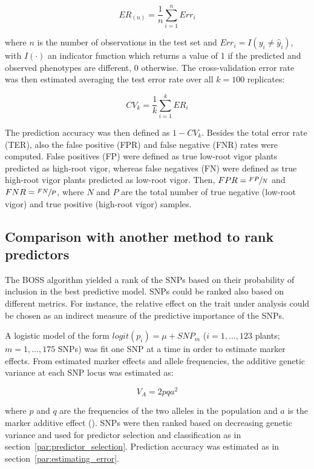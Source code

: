 \begin{equation} \label{eq:testerr}
 ER_{(n)}=\frac{1}{n} \sum_{i=1}^{n} Err_i
\end{equation}

where $n$ is the number of observations in the test set and $Err_i=I(y_i \neq \hat{y}_i)$, with $I(\cdot)$ an indicator function
which returns a value of 1 if the predicted and observed phenotypes are
different, 0 otherwise. 
The cross-validation error rate was then estimated averaging the test error
rate over all $k=100$ replicates:

\begin{equation} \label{eq:cverr}
CV_{k}=\frac{1}{k} \sum_{i=1}^k ER_i
\end{equation}

The prediction accuracy was then defined as $1-CV_k$. Besides the total
error rate (TER), also the false positive (FPR) and false negative (FNR) rates
were computed. False positives (FP) were defined as true low-root vigor
plants predicted as high-root vigor, whereas false negatives (FN) were
defined as true high-root vigor plants predicted as low-root vigor.
Then, $FPR=\sfrac{FP}{N}$ and $FNR=\sfrac{FN}{P}$, where $N$ and $P$ are
the total number of true negative (low-root vigor) and true positive
(high-root vigor) samples.

\subsection{Comparison with another method to rank predictors}
\label{sec:other_ranker}
The BOSS algorithm yielded a rank of the SNPs based on their probability
of inclusion in the best predictive model. SNPs could be ranked also
based on different metrics. For instance, the relative effect on the
trait under analysis could be chosen as an indirect measure of the
predictive importance of the SNPs.

A logistic model of the form $logit(p_i)=\mu+SNP_m$ ($i=1,\ldots,123$
plants; $m=1,\ldots, 175$ SNPs) was fit one SNP
at a time in order to estimate marker effects.
From estimated marker effects and allele frequencies, the additive
genetic variance at each SNP locus was estimated as:

\begin{equation}
V_A=2pqa^2
\end{equation}

where $p$ and $q$ are the frequencies of the two alleles in the
population and $a$ is the marker additive effect
(\cite{gianola2009additive}).
SNPs were then ranked based on decreasing genetic variance and used for
predictor selection and classification as in
section~\ref{par:predictor_selection}. Prediction accuracy was estimated
as in section~\ref{par:estimating_error}.

